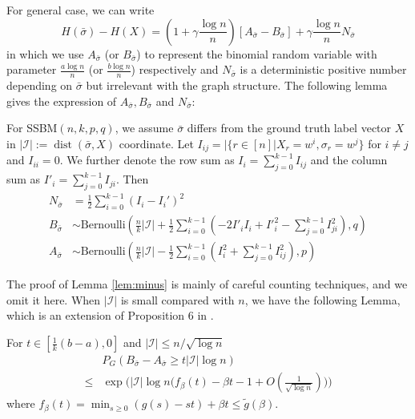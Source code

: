 \documentclass[entropy,article,submit,moreauthors,pdftex]{Definitions/mdpi}
\newcommand{\A}{\frac{a \log n}{n}}
\newcommand{\B}{\frac{b \log n}{n}}
\newcommand{\cI}{\mathcal{I}}
\newcommand{\1}{\mathbbm{1}}
\DeclareMathOperator{\Dist}{dist}
\begin{document}
For general case, we can write
\begin{equation}\label{eq:Hgeneral}
H(\bar{\sigma}) - H(X)=
(1 + \gamma \frac{ \log n}{n})[A_{\bar{\sigma}} - B_{\bar{\sigma}}] + \gamma\frac{ \log n}{n} N_{\bar{\sigma}}
\end{equation}
in which we use $A_{\bar{\sigma}}$ (or $B_{\bar{\sigma}}$) to represent the binomial random variable with parameter $\A$ (or $\B$)
respectively and $N_{\bar{\sigma}}$ is a deterministic positive number depending on $\bar{\sigma}$ but irrelevant with the graph structure.
The following lemma gives the expression of $A_{\bar{\sigma}}, B_{\bar{\sigma}}$ and $N_{\bar{\sigma}}$:
\begin{Lemma}\label{lem:minus}
	For SSBM$(n,k,p,q)$, we assume $\bar{\sigma}$ differs from the ground truth label vector $X$ in $|\cI|:=\Dist(\bar{\sigma}, X)$ coordinate.
	Let $I_{ij} = |\{r\in [n] | X_r = w^i, \sigma_r = w^j \}$ for $i\neq j$ and $I_{ii} = 0$. We further denote the row sum as $I_i = \sum_{j=0}^{k-1} I_{ij}$ and
	the column sum as $I'_i = \sum_{j=0}^{k-1} I_{ji}$.
	Then
	\begin{align}
	N_{\bar{\sigma}} &= \frac{1}{2}\sum_{i=0}^{k-1} (I_i - I_i')^2 \label{eq:N_w} \\
	B_{\bar{\sigma}} & \sim \textrm{Bernoulli}(\frac{n}{k}|\cI| + \frac{1}{2}\sum_{i=0}^{k-1}  (-2 I'_i I_i  + I'^2_i - \sum_{j=0}^{k-1} I^2_{ji}) , q)\\
	A_{\bar{\sigma}} & \sim \textrm{Bernoulli}(\frac{n}{k}|\cI| - \frac{1}{2}\sum_{i=0}^{k-1}  (I^2_i + \sum_{j=0}^{k-1} I^2_{ij}), p) \label{eq:A_w}
	\end{align}
\end{Lemma}
The proof of Lemma \ref{lem:minus} is mainly of careful counting techniques, and we omit it here.
When $|\cI|$ is small compared with $n$, we have the following Lemma, which is an extension of Proposition 6 in \cite{ye2020exact}. 
\begin{Lemma}\label{lem:enhanced_fb}
	For $t\in [\frac{1}{k}(b-a), 0]$
	and $ |\cI| \le n/\sqrt{\log n}$
	\begin{equation} \label{eq:upmpt}
	\begin{aligned}
	& P_G(B_{\bar{\sigma}}-A_{\bar{\sigma}}\ge t |\cI| \log n)  \\
	\le & \exp\Big(|\cI|\log n
	\Big(f_{\beta}(t) - \beta t -1	+ O(\frac{1}{\sqrt{\log n}}) \Big)\Big)
	\end{aligned}
	\end{equation}
	where $f_{\beta}(t) = \min_{s\geq 0} (g(s) - st) + \beta t \leq \tilde{g}(\beta) $.
\end{Lemma}
\end{document}
